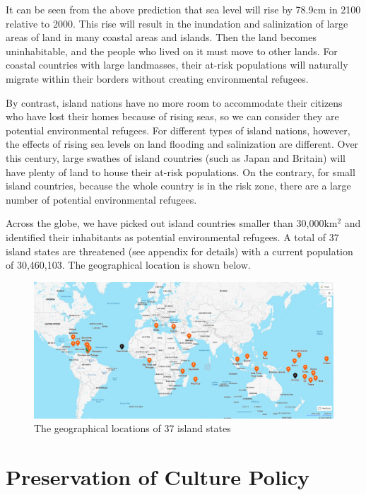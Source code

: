 \documentclass[12pt]{article}  %
\begin{document}
It can be seen from the above prediction that sea level will rise by 78.9cm in 2100 relative to 2000. This rise will result in the inundation and salinization of large areas of land in many coastal areas and islands. Then the land becomes uninhabitable, and the people who lived on it must move to other lands. For coastal countries with large landmasses, their at-risk populations will naturally migrate within their borders without creating environmental refugees. 

By contrast, island nations have no more room to accommodate their citizens who have lost their homes because of rising seas, so we can consider they are potential environmental refugees.
 For different types of island nations, however, the effects of rising sea levels on land flooding and salinization are different. Over this century, large swathes of island countries (such as Japan and Britain) will have plenty of land to house their at-risk populations. On the contrary, for small island countries, because the whole country is in the risk zone, there are a large number of potential environmental refugees.
 
Across the globe, we have picked out island countries smaller than 30,000km$^2$ and identified their inhabitants as potential environmental refugees. 
A total of 37 island states are threatened (see appendix for details) with a current population of 30,460,103. The geographical location is shown below.


\begin{figure}[htbp]\label{5.2}
	\centering
	\includegraphics[width=1\textwidth]{5.2.png}
	\caption{ The geographical locations of 37 island states}\label{5.2}
\end{figure}



\newpage
\section{Preservation of Culture Policy}
\end{document}
